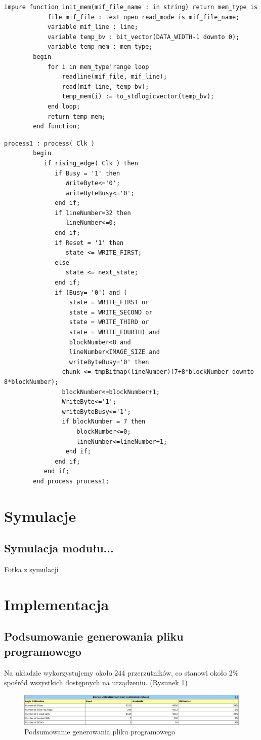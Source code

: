 \documentclass[]{article}
\begin{document}
	\noindent\begin{lstlisting}[style=vhdl, autogobble=true, label={lst:mem}, caption={Funcja inicjalizacji pamięci w module Selector}, captionpos=b]
		impure function init_mem(mif_file_name : in string) return mem_type is
			file mif_file : text open read_mode is mif_file_name;
			variable mif_line : line;
			variable temp_bv : bit_vector(DATA_WIDTH-1 downto 0);
			variable temp_mem : mem_type;
		begin
			for i in mem_type'range loop
				readline(mif_file, mif_line);
				read(mif_line, temp_bv);
				temp_mem(i) := to_stdlogicvector(temp_bv);
			end loop;
			return temp_mem;
		end function;
	\end{lstlisting}
	\noindent\begin{lstlisting}[style=vhdl, autogobble=true, label={lst:send}, caption={Proces wysyłający mapy bitowe cyfr do sterownika w module Selector}, captionpos=b]
		process1 : process( Clk )
		begin
		   if rising_edge( Clk ) then
			  if Busy = '1' then
				 WriteByte<='0';
				 writeByteBusy<='0';
			  end if;
			  if lineNumber=32 then
				 lineNumber<=0;
			  end if;
			  if Reset = '1' then
				 state <= WRITE_FIRST;
			  else
				 state <= next_state;
			  end if;
			  if (Busy= '0') and (
				  state = WRITE_FIRST or 
				  state = WRITE_SECOND or 
				  state = WRITE_THIRD or 
				  state = WRITE_FOURTH) and 
				  blockNumber<8 and 
				  lineNumber<IMAGE_SIZE and 
				  writeByteBusy='0' then
				chunk <= tmpBitmap(lineNumber)(7+8*blockNumber downto 8*blockNumber);
				blockNumber<=blockNumber+1;
				WriteByte<='1';
				writeByteBusy<='1';
				if blockNumber = 7 then
					blockNumber<=0;
					lineNumber<=lineNumber+1;
				 end if;
			  end if;
		   end if;
		end process process1;
	\end{lstlisting}

	\section{Symulacje}
	\subsection{Symulacja modułu...}
	Fotka z symulacji
	
	
	\section{Implementacja}
	\subsection{Podsumowanie generowania pliku programowego}
	Na układzie wykorzystujemy około 244 przerzutników, co stanowi około 2\% spośród wszystkich dostępnych na urządzeniu. (Rysunek \ref{fig:summary})
	\begin{figure}[H]
		\includegraphics[width=\linewidth]{img/design_summary.jpg}
		\caption{Podsumowanie generowania pliku programowego}
		\label{fig:summary}
	\end{figure}
	
\end{document}
